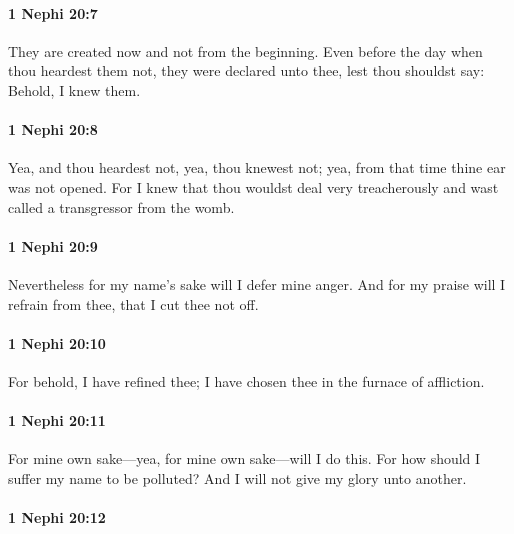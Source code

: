 		\paragraph{1 Nephi 20:7} %
			\label{1NEPHI-20-7}

			They are created now and not from the beginning.
			Even before the day when thou heardest them not,
			they were declared unto thee,
			lest thou shouldst say:
			Behold, I knew them.

		\paragraph{1 Nephi 20:8} %
			\label{1NEPHI-20-8}

			Yea, and thou heardest not,
			yea, thou knewest not;
			yea, from that time thine ear was not opened.
			For I knew that thou wouldst deal very treacherously
			and wast called a transgressor from the womb.

		\paragraph{1 Nephi 20:9} %
			\label{1NEPHI-20-9}

			Nevertheless for my name’s sake will I defer mine anger.
			And for my praise will I refrain from thee,
			that I cut thee not off.

		\paragraph{1 Nephi 20:10} %
			\label{1NEPHI-20-10}

			For behold, I have refined thee;
			I have chosen thee in the furnace of affliction.

		\paragraph{1 Nephi 20:11} %
			\label{1NEPHI-20-11}

			For mine own sake—yea, for mine own sake—will I do this.
			For how should I suffer my name to be polluted?
			And I will not give my glory unto another.

		\paragraph{1 Nephi 20:12} %
			\label{1NEPHI-20-12}

